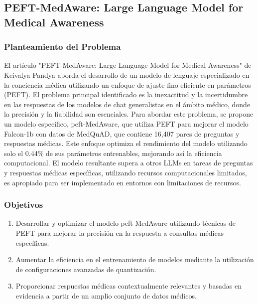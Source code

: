 \subsection{PEFT-MedAware: Large Language Model for Medical Awareness \citep*{peftmedaware_2023}}
		\subsubsection{Planteamiento del Problema}
				El artículo "PEFT-MedAware: Large Language Model for Medical Awareness" de Keivalya Pandya aborda el desarrollo de un modelo de lenguaje especializado en la conciencia médica utilizando un enfoque de ajuste fino eficiente en parámetros (PEFT). El problema principal identificado es la inexactitud y la incertidumbre en las respuestas de los modelos de chat generalistas en el ámbito médico, donde la precisión y la fiabilidad son esenciales. Para abordar este problema, se propone un modelo específico, peft-MedAware, que utiliza PEFT para mejorar el modelo Falcon-1b con datos de MedQuAD, que contiene 16,407 pares de preguntas y respuestas médicas. Este enfoque optimiza el rendimiento del modelo utilizando solo el 0.44\% de sus parámetros entrenables, mejorando así la eficiencia computacional. El modelo resultante supera a otros LLMs en tareas de preguntas y respuestas médicas específicas, utilizando recursos computacionales limitados, es apropiado para ser implementado en entornos con limitaciones de recursos.
		
	\subsubsection{Objetivos}
		\begin{enumerate}
			\item Desarrollar y optimizar el modelo peft-MedAware utilizando técnicas de PEFT para mejorar la precisión en la respuesta a consultas médicas específicas.\vspace{-2mm}		
			\item Aumentar la eficiencia en el entrenamiento de modelos mediante la utilización de configuraciones avanzadas de quantización.\vspace{-2mm}
			\item Proporcionar respuestas médicas contextualmente relevantes y basadas en evidencia a partir de un amplio conjunto de datos médicos.\vspace{-2mm}
		\end{enumerate}
				
